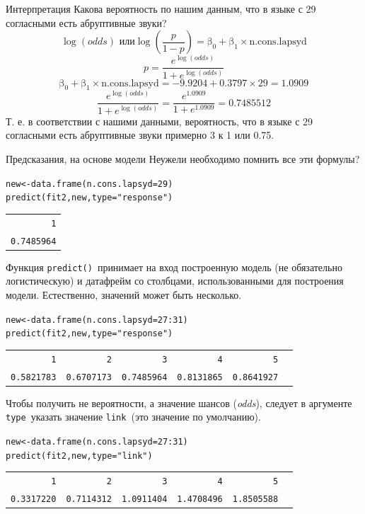 \begin{frame}{Интерпретация}
Какова вероятность по нашим данным, что в языке с 29 согласными есть абруптивные звуки?
$$\log(odds) \mbox{ или} \log\left(\frac{p}{1-p}\right) = \mbox{β}_0+\mbox{β}_1\times \mbox{n.cons.lapsyd}$$
$$ p = \frac{e^{\log(odds)}}{1+e^{\log(odds)}}$$
\vfill
$$\mbox{β}_0+\mbox{β}_1\times \mbox{n.cons.lapsyd} =  -9.9204+0.3797 \times 29 = 1.0909$$
$$\frac{e^{\log(odds)}}{1+e^{\log(odds)}} = \frac{e^{1.0909}}{1+e^{1.0909}} = 0.7485512$$
Т. е. в соответствии с нашими данными, вероятность, что в языке с 29 согласными есть абруптивные звуки примерно 3 к 1 или 0.75.
\end{frame}
\begin{frame}{Предсказания, на основе модели}
Неужели необходимо помнить все эти формулы?
\scriptsize
\begin{alltt}
new <- data.frame(\alert{n.cons.lapsyd = 29})\\
\alert{predict(fit2, new, type="response")}\\
\begin{tabular}{r}
        1 \\
0.7485964 \\
\end{tabular}
\end{alltt}
\normalsize
Функция \scriptsize\verb"predict()"\normalsize\ принимает на вход построенную модель (не обязательно логистическую) и датафрейм со столбцами, использованными для построения модели. Естественно, значений может быть несколько.
\scriptsize
\begin{alltt}
new <- data.frame(n.cons.lapsyd = \alert{27:31})\\
predict(fit2, new, type="response")\\
\begin{tabular}{rrrrrr}
        1  & 2 & 3& 4 & 5\\
0.5821783 & 0.6707173 & 0.7485964 & 0.8131865 & 0.8641927\\
\end{tabular}
\end{alltt}
\normalsize
Чтобы получить не вероятности, а значение шансов (\textit{odds}), следует в аргументе \scriptsize\verb"type"\normalsize\ указать значение \scriptsize\verb"link"\normalsize\ (это значение по умолчанию).
\scriptsize
\begin{alltt}
new <- data.frame(n.cons.lapsyd = 27:31)\\
predict(fit2, new, \alert{type="link"})\\
\begin{tabular}{rrrrrr}
        1  & 2 & 3& 4 & 5\\
0.3317220& 0.7114312 & 1.0911404 & 1.4708496 & 1.8505588 \\
\end{tabular}
\end{alltt}
\normalsize
\end{frame}
